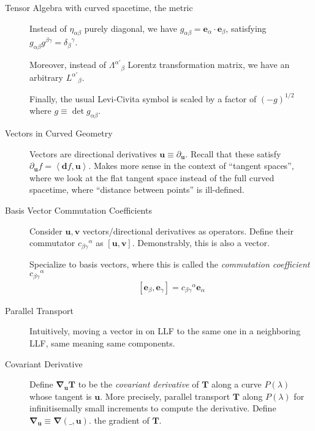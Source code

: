 \documentclass[12pt]{report}
\newcommand{\bm}[1]{\boldsymbol{\mathbf{#1}}}
\newcommand{\expvalue}[1]{\left<#1\right>}
\begin{document}
\begin{description}
    \item[Tensor Algebra with curved spacetime, the metric] Instead of
        $\eta_{\alpha\beta}$ purely diagonal, we have
        $g_{\alpha\beta} = \bm{e}_\alpha \cdot \bm{e}_\beta$, satisfying
        $g_{\alpha\beta}g^{\beta\gamma} = {\delta_{\beta}}^\gamma$.

        Moreover, instead of ${\Lambda^{\alpha'}}_\beta$ Lorentz transformation
        matrix, we have an arbitrary ${L^{\alpha'}}_\beta$.

        Finally, the usual Levi-Civita symbol is scaled by a factor of
        $(-g)^{1/2}$ where $g \equiv \det g_{\alpha\beta}$.

    \item[Vectors in Curved Geometry] Vectors are directional derivatives
        $\bm{u} \equiv \partial_{\bm{u}}$. Recall that these satisfy
        $\partial_{\bm{u}} f = \expvalue{\bm{d}f, \bm{u}}$. Makes more sense in
        the context of ``tangent spaces'', where we look at the flat tangent
        space instead of the full curved spacetime, where ``distance between
        points'' is ill-defined.

    \item[Basis Vector Commutation Coefficients] Consider $\bm{u}, \bm{v}$
        vectors/directional derivatives as operators. Define their
        commutator ${c_{\beta\gamma}}^\alpha$ as
        $\left[ \bm{u}, \bm{v} \right]$. Demonstrably, this is also a vector.

        Specialize to basis vectors, where this is called the
        \emph{commutation coefficient} ${c_{\beta\gamma}}^\alpha$
        \begin{align}
            \left[ \bm{e}_\beta, \bm{e}_\gamma \right] =
            {c_{\beta\gamma}}^\alpha \bm{e}_\alpha
        \end{align}

    \item[Parallel Transport] Intuitively, moving a vector in on LLF to the same
        one in a neighboring LLF, same meaning same components.

    \item[Covariant Derivative] Define $\bm{\nabla}_{\bm{u}} \bm{T}$ to be the
        \emph{covariant derivative} of $\bm{T}$ along a curve $P(\lambda)$ whose
        tangent is $\bm{u}$. More precisely, parallel transport $\bm{T}$ along
        $P(\lambda)$ for infinitisemally small increments to compute the
        derivative. Define $\bm{\nabla}_{\bm{u}} \equiv \bm{\nabla}(\_, \bm{u})$.
        the gradient of $\bm{T}$.


\end{description}
\end{document}
